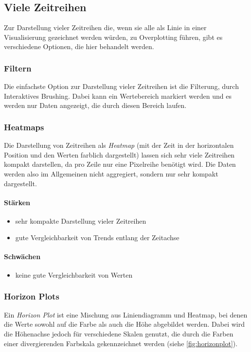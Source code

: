 		\subsection{Viele Zeitreihen}
			Zur Darstellung vieler Zeitreihen die, wenn sie alle als Linie in einer Visualisierung gezeichnet werden würden, zu Overplotting führen, gibt es verschiedene Optionen, die hier behandelt werden.

			\subsubsection{Filtern}
				Die einfachste Option zur Darstellung vieler Zeitreihen ist die Filterung, \bspw durch Interaktives Brushing. Dabei kann \zB ein Wertebereich markiert werden und es werden nur Daten angezeigt, die durch diesen Bereich laufen.

			\subsubsection{Heatmaps}
				Die Darstellung von Zeitreihen als \emph{Heatmap} (mit der Zeit in der horizontalen Position und den Werten farblich dargestellt) lassen sich sehr viele Zeitreihen kompakt darstellen, da pro Zeile nur eine Pixelreihe benötigt wird. Die Daten werden also im Allgemeinen nicht aggregiert, sondern nur sehr kompakt dargestellt.

				\paragraph{Stärken}
				\begin{itemize}
					\item sehr kompakte Darstellung vieler Zeitreihen
					\item gute Vergleichbarkeit von Trends entlang der Zeitachse
				\end{itemize}

				\paragraph{Schwächen}
				\begin{itemize}
					\item keine gute Vergleichbarkeit von Werten
				\end{itemize}

			\subsubsection{Horizon Plots}
				Ein \emph{Horizon Plot} ist eine Mischung aus Liniendiagramm und Heatmap, bei denen die Werte sowohl auf die Farbe als auch die Höhe abgebildet werden. Dabei wird die Höhenachse jedoch für verschiedene Skalen genutzt, die durch die Farben einer divergierenden Farbskala gekennzeichnet werden (siehe \autoref{fig:horizonplot}).

